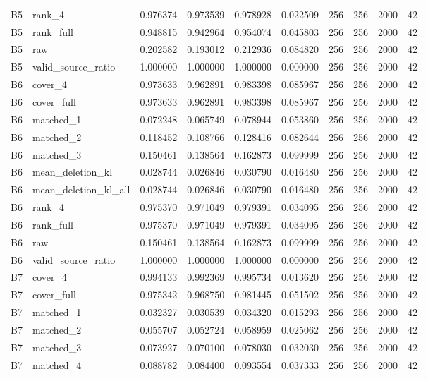 \begin{tabular}{llrrrrrrrr}
B5 & rank_4 & 0.976374 & 0.973539 & 0.978928 & 0.022509 & 256 & 256 & 2000 & 42 \\
B5 & rank_full & 0.948815 & 0.942964 & 0.954074 & 0.045803 & 256 & 256 & 2000 & 42 \\
B5 & raw & 0.202582 & 0.193012 & 0.212936 & 0.084820 & 256 & 256 & 2000 & 42 \\
B5 & valid_source_ratio & 1.000000 & 1.000000 & 1.000000 & 0.000000 & 256 & 256 & 2000 & 42 \\
B6 & cover_4 & 0.973633 & 0.962891 & 0.983398 & 0.085967 & 256 & 256 & 2000 & 42 \\
B6 & cover_full & 0.973633 & 0.962891 & 0.983398 & 0.085967 & 256 & 256 & 2000 & 42 \\
B6 & matched_1 & 0.072248 & 0.065749 & 0.078944 & 0.053860 & 256 & 256 & 2000 & 42 \\
B6 & matched_2 & 0.118452 & 0.108766 & 0.128416 & 0.082644 & 256 & 256 & 2000 & 42 \\
B6 & matched_3 & 0.150461 & 0.138564 & 0.162873 & 0.099999 & 256 & 256 & 2000 & 42 \\
B6 & mean_deletion_kl & 0.028744 & 0.026846 & 0.030790 & 0.016480 & 256 & 256 & 2000 & 42 \\
B6 & mean_deletion_kl_all & 0.028744 & 0.026846 & 0.030790 & 0.016480 & 256 & 256 & 2000 & 42 \\
B6 & rank_4 & 0.975370 & 0.971049 & 0.979391 & 0.034095 & 256 & 256 & 2000 & 42 \\
B6 & rank_full & 0.975370 & 0.971049 & 0.979391 & 0.034095 & 256 & 256 & 2000 & 42 \\
B6 & raw & 0.150461 & 0.138564 & 0.162873 & 0.099999 & 256 & 256 & 2000 & 42 \\
B6 & valid_source_ratio & 1.000000 & 1.000000 & 1.000000 & 0.000000 & 256 & 256 & 2000 & 42 \\
B7 & cover_4 & 0.994133 & 0.992369 & 0.995734 & 0.013620 & 256 & 256 & 2000 & 42 \\
B7 & cover_full & 0.975342 & 0.968750 & 0.981445 & 0.051502 & 256 & 256 & 2000 & 42 \\
B7 & matched_1 & 0.032327 & 0.030539 & 0.034320 & 0.015293 & 256 & 256 & 2000 & 42 \\
B7 & matched_2 & 0.055707 & 0.052724 & 0.058959 & 0.025062 & 256 & 256 & 2000 & 42 \\
B7 & matched_3 & 0.073927 & 0.070100 & 0.078030 & 0.032030 & 256 & 256 & 2000 & 42 \\
B7 & matched_4 & 0.088782 & 0.084400 & 0.093554 & 0.037333 & 256 & 256 & 2000 & 42 \\

\end{tabular}
